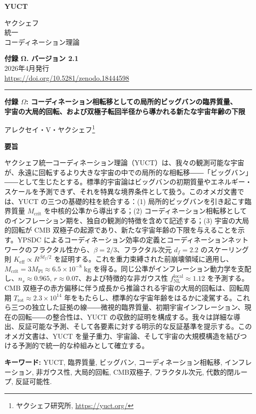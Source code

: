 \documentclass[11pt,a4paper]{article}
\newcommand{\Keff}{K_{\mathrm{eff}}}
\newcommand{\makeheader}{%
	\noindent
	\begin{minipage}{0.17\textwidth}
		\raggedright
		{\sffamily\bfseries\color{skyblue}\fontsize{46}{46}\selectfont YUCT}%
	\end{minipage}%
	\hspace{30pt}
	\begin{minipage}{0.32\textwidth}
		\raggedright
		{\sffamily\fontsize{11}{13}\selectfont ヤクシェフ\\ 統一\\ コーディネーション理論}%
	\end{minipage}%
	\hfill
	\begin{minipage}{0.38\textwidth}
		\raggedleft
		{\sffamily\bfseries 付録 Ω. バージョン 2.1}\\
		{\sffamily 2026年4月発行}\\
		{\sffamily\footnotesize \url{https://doi.org/10.5281/zenodo.18444598}}%
	\end{minipage}
	\par\vspace{5pt}
	\noindent\textcolor{gold}{\rule{\textwidth}{1.6pt}}
	\par\vspace{0pt}
}
\begin{document}
	\renewcommand{\thepage}{\arabic{page}}
	\thispagestyle{firstpage}
	\makeheader
	
	\vspace{0cm}
	{\LARGE\bfseries 付録 \(\Omega\): コーディネーション相転移としての局所的ビッグバンの臨界質量、\\ 宇宙の大局的回転、および双極子転回半径から導かれる新たな宇宙年齢の下限 \par}
	\vspace{0.2cm}
	
	{\large アレクセイ・V・ヤクシェフ\footnote{ヤクシェフ研究所, \url{https://yuct.org/}}} \\
	\vspace{0.0cm}
	
	{\color{darkblue}\textbf{\LARGE 要旨}} \par
	{\large
		\noindent
		ヤクシェフ統一コーディネーション理論（YUCT）は、我々の観測可能な宇宙が、永遠に回転するより大きな宇宙の中での局所的な相転移――「ビッグバン」――として生じたとする。標準的宇宙論はビッグバンの初期質量やエネルギー・スケールを予測できず、それを特異な境界条件として扱う。このオメガ文書では、YUCT の三つの基礎的柱を統合する：(1) 局所的ビッグバンを引き起こす臨界質量 \(M_{\mathrm{crit}}\) を中核的公準から導出する；(2) コーディネーション相転移としてのインフレーション期を、独自の観測的特徴を含めて記述する；(3) 宇宙の大局的回転が CMB 双極子の起源であり、新たな宇宙年齢の下限を与えることを示す。YPSDC によるコーディネーション効率の定義とコーディネーションネットワークのフラクタル性から、\(\beta = 2/3\)、フラクタル次元 \(d_f = 2.2\) のスケーリング則 \(\Keff \propto R^{\beta d_f/2}\) を証明する。これを重力束縛された前崩壊領域に適用し、\(M_{\mathrm{crit}} = 3 M_{\mathrm{Pl}} \approx 6.5 \times 10^{-8}\;\text{kg}\) を得る。同じ公準がインフレーション動力学を支配し、\(n_s \approx 0.965\), \(r \approx 0.07\)、および特徴的な非ガウス性 \(f_{\mathrm{NL}}^{\mathrm{local}} \approx 1.12\) を予測する。CMB 双極子の赤方偏移に伴う成長から推論される宇宙の大局的回転は、回転周期 \(T_{\mathrm{rot}} \approx 2.3 \times 10^{14}\) 年をもたらし、標準的な宇宙年齢をはるかに凌駕する。これら三つの独立した証拠の線――微視的臨界質量、初期宇宙インフレーション、現在の回転――の整合性は、YUCT の収斂的証明を構成する。我々は詳細な導出、反証可能な予測、そして各要素に対する明示的な反証基準を提示する。このオメガ文書は、YUCT を量子重力、宇宙論、そして宇宙の大規模構造を結びつける予測的で統一的な枠組みとして確立する。
	}
	
	\vspace{0.1cm}
	\noindent
	{\color{darkblue}\textbf{キーワード:}} YUCT, 臨界質量, ビッグバン, コーディネーション相転移, インフレーション, 非ガウス性, 大局的回転, CMB双極子, フラクタル次元, 代数的閉ループ, 反証可能性.
	
\end{document}
